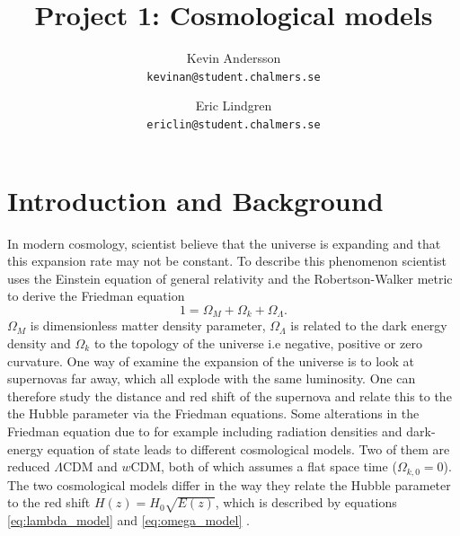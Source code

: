 \documentclass[11pt,a4paper]{article}
\title{Project 1: Cosmological models}
\author{
  Kevin Andersson\\
  \texttt{kevinan@student.chalmers.se}
  \and
   Eric Lindgren\\
  \texttt{ericlin@student.chalmers.se}
}
\begin{document}
\maketitle



\setcounter{page}{1}
\section{Introduction and Background}
In modern cosmology, scientist believe that the universe is expanding and that this expansion rate may not be constant. To describe this phenomenon scientist uses the Einstein equation of general relativity and the Robertson-Walker metric to derive the Friedman equation 
\begin{equation}
    \label{eq:friedman}
    1 = \Omega_{M} + \Omega_{k} + \Omega_{\Lambda}.
\end{equation}
$\Omega_M$ is dimensionless matter density parameter, $\Omega_\Lambda$ is related to the dark energy density and $\Omega_k$ to the topology of the universe i.e negative, positive or zero curvature. One way of examine the expansion of the universe is to look at supernovas far away, which all explode with the same luminosity. One can therefore study the distance and red shift of the supernova and relate this to the the Hubble parameter via the Friedman equations. Some alterations in the Friedman equation due to for example including radiation densities and dark-energy equation of state leads to different cosmological models. Two of them are reduced $\Lambda$CDM and $w$CDM, both of which assumes a flat space time ($\Omega_{k,0}=0$). The two cosmological models differ in the way they relate the Hubble parameter to the red shift $H(z) = H_0\sqrt{E(z)}$, which is described by equations \eqref{eq:lambda_model} and \eqref{eq:omega_model} \cite{project_pm}.

\end{document}
